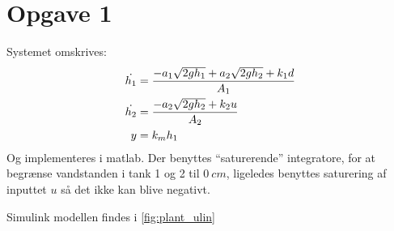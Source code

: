 \section{Opgave 1}
Systemet omskrives:
\begin{align*}
\dot{h_1} &= \frac{-a_1\sqrt{2gh_1} + a_2\sqrt{2gh_2} + k_1d}{A_1}\\
\dot{h_2} &= \frac{-a_2\sqrt{2gh_2} + k_2u}{A_2}\\
y &= k_mh_1\\
\end{align*}
Og implementeres i matlab. Der benyttes ``saturerende'' integratore, for at
begrænse vandstanden i tank 1 og 2 til $0~cm$, ligeledes benyttes saturering af
inputtet $u$ så det ikke kan blive negativt.

Simulink modellen findes i \ref{fig:plant_ulin}

